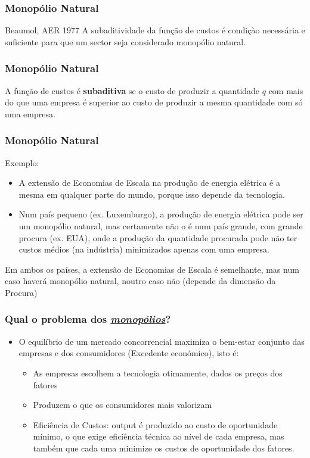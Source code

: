 \begin{frame}
	\frametitle{Monop\'olio Natural}
	\begin{aquote}{Beaumol, AER 1977}
		A subaditividade da fun\c c\~ao de custos \'e condi\c c\`ao necess\'aria e suficiente para que um sector seja considerado monop\'olio natural.
	\end{aquote}
\end{frame}

\begin{frame}
	\frametitle{Monop\'olio Natural}
	A fun\c c\~ao de custos \'e \textbf{subaditiva} se o custo de produzir a quantidade $q$ com mais do que uma empresa \'e superior ao custo de produzir a mesma quantidade com s\'o uma empresa.
\end{frame}

\begin{frame}
	\frametitle{Monop\'olio Natural}
	Exemplo:
	\begin{itemize}
		\item A extens\~ao de Economias de Escala na produ\c c\~ao de energia el\'etrica \'e a mesma em qualquer parte do mundo, porque isso depende da tecnologia.\pause
		\item Num pa\'is pequeno (ex. Luxemburgo), a produ\c c\~ao de energia el\'etrica pode ser um monop\'olio natural, mas certamente n\~ao o \'e num pa\'is grande, com grande procura (ex. EUA), onde a produ\c c\~ao da quantidade procurada pode n\~ao ter custos m\'edios (na ind\'ustria) minimizados apenas com uma empresa.\pause
	\end{itemize}
	Em ambos os pa\'ises, a extens\~ao de Economias de Escala \'e semelhante, mas num caso haver\'a monop\'olio natural, noutro caso n\~ao (depende da dimens\~ao da Procura)
\end{frame}

\begin{frame}
	\frametitle{Qual o problema dos \emph{\underline{monop\'olios}}?}
	\begin{itemize}
		\item O equil\'ibrio de um mercado concorrencial maximiza o bem-estar conjunto das empresas e dos consumidores (Excedente econ\'omico), isto \'e:\pause
		\begin{itemize}
			\item As empresas escolhem a tecnologia otimamente, dados os pre\c cos dos fatores\pause
			\item Produzem o que os consumidores mais valorizam\pause
			\item Efici\^encia de Custos: output \'e produzido ao custo de oportunidade m\'inimo, o que exige efici\^encia t\'ecnica ao n\'ivel de cada empresa, mas tamb\'em que cada uma minimize os custos de oportunidade dos fatores.
		\end{itemize}
	\end{itemize}
\end{frame}

